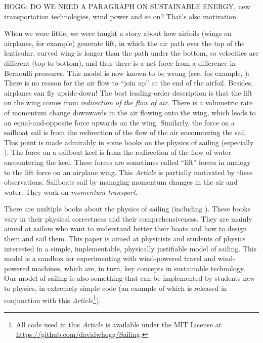 \documentclass[letterpaper]{article}
\newcommand{\documentname}{\textsl{Article}}
\begin{document}
HOGG: DO WE NEED A PARAGRAPH ON SUSTAINABLE ENERGY, new transportation technologies, wind power and so on? That's also motivation.

When we were little, we were taught a story about how airfoils (wings on airplanes, for example) generate lift, in which the air path over the top of the lenticular, curved wing is longer than the path under the bottom, so velocities are different (top to bottom), and thus there is a net force from a difference in Bernoulli pressures.
This model is now known to be wrong (see, for example, \cite{lift}):
There is no reason for the air flow to ``join up'' at the end of the airfoil.
Besides, airplanes can fly upside-down!
The best leading-order description is that the lift on the wing comes from \emph{redirection of the flow of air}.
There is a volumetric rate of momentum change downwards in the air flowing onto the wing, which leads to an equal-and-opposite force upwards on the wing.
Similarly, the force on a sailboat sail is from the redirection of the flow of the air encountering the sail.
This point is made admirably in some books on the physics of sailing (especially \cite{sails}).
The force on a sailboat keel is from the redirection of the flow of water encountering the keel.
These forces are sometimes called ``lift'' forces in analogy to the lift force on an airplane wing.
This \documentname{} is partially motivated by these observations.
Sailboats sail by managing momentum changes in the air and water.
They work on \emph{momentum transport}.

There are multiple books about the physics of sailing (including \cite{symmetry, explained, sails, pos}).
These books vary in their physical correctness and their comprehensiveness.
They are mainly aimed at sailors who want to understand better their boats and how to design them and sail them.
This paper is aimed at physicists and students of physics interested in a simple, implementable, physically justifiable model of sailing.
This model is a sandbox for experimenting with wind-powered travel and wind-powered machines, which are, in turn, key concepts in sustainable technology.
Our model of sailing is also something that can be implemented by students new to physics, in extremely simple code (an example of which is released in conjunction with this \documentname\footnote{All code used in this \documentname{} is available under the MIT License at \url{https://github.com/davidwhogg/Sailing}.}).
\end{document}
